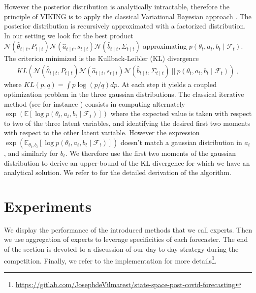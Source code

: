 \documentclass[transmag]{IEEEtran}
\begin{document}
However the posterior distribution is analytically intractable, therefore the principle of VIKING is to apply the classical Variational Bayesian approach \cite{vsmidl2006variational}. The posterior distribution is recursively approximated with a factorized distribution. In our setting we look for the best product $\mathcal{N}(\hat\theta_{t\mid t},P_{t\mid t}) \mathcal{N}(\hat a_{t\mid t},s_{t\mid t})\mathcal{N}(\hat b_{t\mid t},\Sigma_{t\mid t})$ approximating $p(\theta_t,a_t,b_t\mid \mathcal{F}_t)$. The criterion minimized is the Kullback-Leibler (KL) divergence
\begin{align*}
    KL(\mathcal{N}(\hat\theta_{t\mid t},P_{t\mid t}) \mathcal{N}(\hat a_{t\mid t},s_{t\mid t})\mathcal{N}(\hat b_{t\mid t},\Sigma_{t\mid t})\ ||\ p(\theta_t,a_t,b_t\mid \mathcal{F}_t)) \,,
\end{align*}
where $KL(p,q)=\int p\log(p/q)dp$. At each step it yields a coupled optimization problem in the three gaussian distributions. The classical iterative method (see for instance \cite{tzikas2008variational}) consists in computing alternately $\exp(\mathbb{E}[\log p(\theta_t,a_t,b_t\mid \mathcal{F}_t)])$ where the expected value is taken with respect to two of the three latent variables, and identifying the desired first two moments with respect to the other latent variable. However the expression $\exp(\mathbb{E}_{\theta_t,b_t}[\log p(\theta_t,a_t,b_t\mid \mathcal{F}_t)])$ doesn't match a gaussian distribution in $a_t$, and similarly for $b_t$. We therefore use the first two moments of the gaussian distribution to derive an upper-bound of the KL divergence for which we have an analytical solution. We refer to \cite{tsw} for the detailed derivation of the algorithm.




\section{Experiments}\label{sec:experiments}
We display the performance of the introduced methods that we call experts. Then we use aggregation of experts to leverage specificities of each forecaster. The end of the section is devoted to a discussion of our day-to-day strategy during the competition. Finally, we refer to the implementation for more details\footnote{\href{https://gitlab.com/JosephdeVilmarest/state-space-post-covid-forecasting}{https://gitlab.com/JosephdeVilmarest/state-space-post-covid-forecasting}}.
\end{document}
